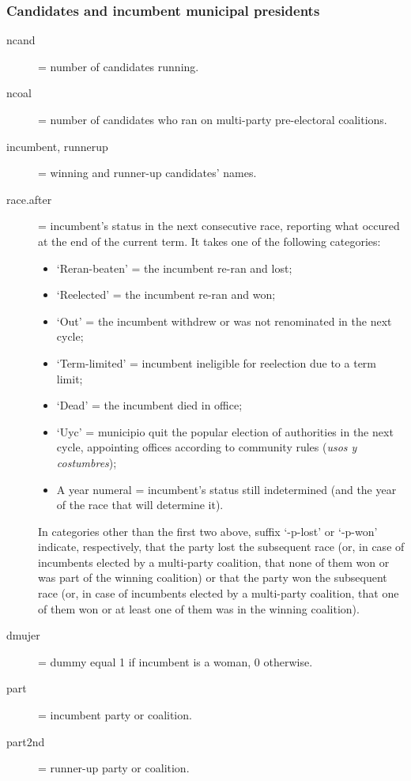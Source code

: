 \documentclass[letter,12pt]{article}
\begin{document}
\begin{singlespace}
\subsubsection{Candidates and incumbent municipal presidents}
\begin{description}
\item[ncand] = number of candidates running.
\item[ncoal] = number of candidates who ran on multi-party pre-electoral coalitions. 
\item[incumbent, runnerup] = winning and runner-up candidates' names.
\item[race.after] = incumbent's status in the next consecutive race, reporting what occured at the end of the current term. It takes one of the following categories:
  \begin{itemize}
  \item `Reran-beaten' = the incumbent re-ran and lost; 
  \item `Reelected' = the incumbent re-ran and won; 
  \item `Out' = the incumbent withdrew or was not renominated in the next cycle; 
  \item `Term-limited' = incumbent ineligible for reelection due to a term limit; 
  \item `Dead' = the incumbent died in office;
  \item `Uyc' = municipio quit the popular election of authorities in the next cycle, appointing offices according to community rules (\emph{usos y costumbres});
  \item A year numeral = incumbent's status still indetermined (and the year of the race that will determine it).
  \end{itemize}
In categories other than the first two above, suffix `-p-lost' or `-p-won' indicate, respectively, that the party lost the subsequent race (or, in case of incumbents elected by a multi-party coalition, that none of them won or was part of the winning coalition) or that the party won the subsequent race (or, in case of incumbents elected by a multi-party coalition, that one of them won or at least one of them was in the winning coalition).
\item[dmujer] = dummy equal 1 if incumbent is a woman, 0 otherwise. 
\item[part] = incumbent party or coalition.
\item[part2nd] = runner-up party or coalition.
\end{description}

\end{singlespace}
\end{document}
